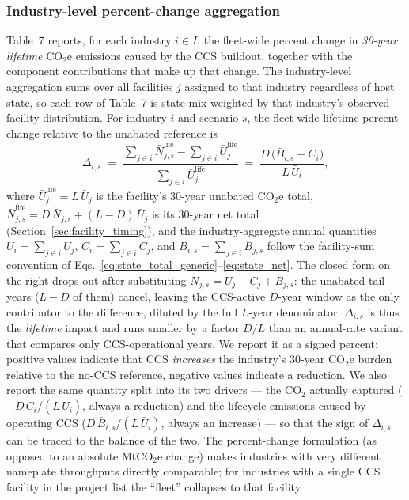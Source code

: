 \documentclass[11pt]{article}
\newcommand{\cotwo}{\ensuremath{\mathrm{CO_2}}}
\newcommand{\cotwoe}{\ensuremath{\mathrm{CO_{2}e}}}
\begin{document}
\subsubsection{Industry-level percent-change aggregation}
\label{sec:industry_pct_change}

Table~7 reports, for each industry $i \in I$, the fleet-wide percent change in \emph{30-year lifetime} \cotwoe{} emissions caused by the CCS buildout, together with the component contributions that make up that change. The industry-level aggregation sums over all facilities $j$ assigned to that industry regardless of host state, so each row of Table~7 is state-mix-weighted by that industry's observed facility distribution. For industry $i$ and scenario $s$, the fleet-wide lifetime percent change relative to the unabated reference is
%
\begin{equation}
  \Delta_{i,s} \;=\; \frac{\sum_{j \in i} \bar{N}^{\text{life}}_{j,s} - \sum_{j \in i} \bar{U}^{\text{life}}_{j}}{\sum_{j \in i} \bar{U}^{\text{life}}_{j}}
  \;=\; \frac{D\,\bigl(\bar{B}_{i,s} - C_{i}\bigr)}{L\,\bar{U}_{i}},
  \label{eq:industry_pct_change}
\end{equation}
%
where $\bar{U}^{\text{life}}_j = L\,\bar{U}_j$ is the facility's 30-year unabated \cotwoe{} total, $\bar{N}^{\text{life}}_{j,s} = D\,\bar{N}_{j,s} + (L - D)\,\bar{U}_j$ is its 30-year net total (Section~\ref{sec:facility_timing}), and the industry-aggregate annual quantities $\bar{U}_i = \sum_{j \in i} \bar{U}_j$, $C_i = \sum_{j \in i} C_j$, and $\bar{B}_{i,s} = \sum_{j \in i} \bar{B}_{j,s}$ follow the facility-sum convention of Eqs.~\eqref{eq:state_total_generic}--\eqref{eq:state_net}. The closed form on the right drops out after substituting $\bar{N}_{j,s} = \bar{U}_j - C_j + \bar{B}_{j,s}$: the unabated-tail years ($L - D$ of them) cancel, leaving the CCS-active $D$-year window as the only contributor to the difference, diluted by the full $L$-year denominator. $\Delta_{i,s}$ is thus the \emph{lifetime} impact and runs smaller by a factor $D/L$ than an annual-rate variant that compares only CCS-operational years. We report it as a signed percent: positive values indicate that CCS \emph{increases} the industry's 30-year \cotwoe{} burden relative to the no-CCS reference, negative values indicate a reduction. We also report the same quantity split into its two drivers --- the \cotwo{} actually captured ($-D\,C_i / (L\,\bar{U}_i)$, always a reduction) and the lifecycle emissions caused by operating CCS ($D\,\bar{B}_{i,s} / (L\,\bar{U}_i)$, always an increase) --- so that the sign of $\Delta_{i,s}$ can be traced to the balance of the two. The percent-change formulation (as opposed to an absolute MtCO$_2$e change) makes industries with very different nameplate throughputs directly comparable; for industries with a single CCS facility in the project list the ``fleet'' collapses to that facility.
\end{document}
